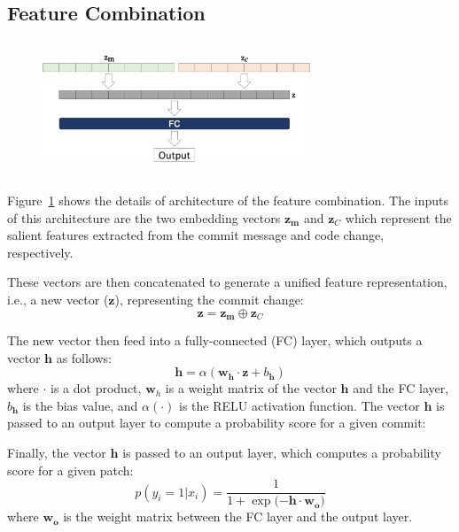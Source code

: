 
\subsection{Feature Combination}
\label{sec:ftr_combine}
\begin{figure}
	\center
	\includegraphics[width=8cm,height=4cm]{figs/code_msg.pdf}
	\caption{}
	\label{fig:code_msg}
\end{figure}

Figure~\ref{fig:code_msg} shows the details of architecture of the feature combination. The inputs of this architecture are the two embedding vectors $\textbf{z}_\textbf{m}$ and $\textbf{z}_C$ which represent the salient features extracted from the commit message and code change, respectively. 

These vectors are then concatenated to generate a unified feature representation, i.e., a new vector ($\textbf{z}$), representing the commit change:
\begin{equation}
\label{eq:commit_code}
\textbf{z} = \textbf{z}_\textbf{m} \oplus \textbf{z}_C
\end{equation}

The new vector then feed into a fully-connected (FC) layer, which outputs a vector $\textbf{h}$ as follows:
\begin{equation}  %
\label{eq:fully_layer}
\textbf{h} = \alpha(\textbf{w}_\textbf{h} \cdot \textbf{z} + b_\textbf{h})
\end{equation}
where $\cdot$ is a dot product, $\textbf{w}_h$ is a weight matrix of the vector $\textbf{h}$ and the FC layer, $b_\textbf{h}$ is the bias value, and $\alpha(\cdot)$ is the RELU activation function. The vector $\textbf{h}$ is passed to an output layer to compute a probability score for a given commit:


Finally, the vector $\mathbf{h}$ is passed to an output layer, which
computes a probability score for a given patch:
\begin{equation}  %
p(y_i=1|x_i) = \frac{1}{1 + \exp({-\textbf{h} \cdot \textbf{w}_\textbf{o})}}
\end{equation}
where $\textbf{w}_\textbf{o}$ is the weight matrix between the FC layer and the output layer.

